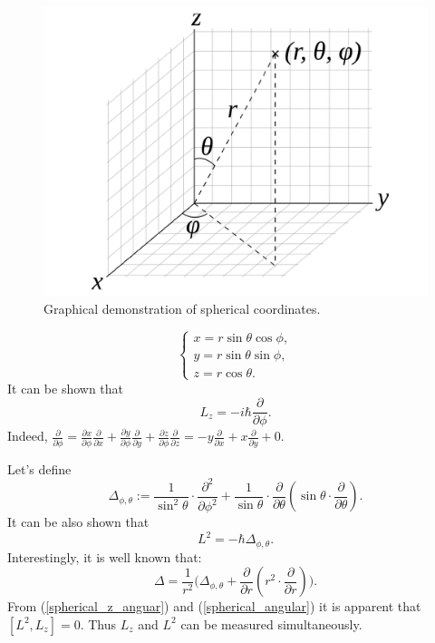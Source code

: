 \documentclass[main.tex]{subfiles}
\begin{document}
\begin{figure}[H]
\centering
\includegraphics[scale=0.5]{figs/Spherical}
\caption{Graphical demonstration of spherical coordinates.}
\label{fig:hoop}
\end{figure}
\begin{equation}
\begin{cases}
x = r\sin\theta \cos\phi,\\
y = r\sin\theta \sin\phi,\\
z = r\cos\theta.
\end{cases}
\end{equation}
It can be shown that
\begin{equation}
\label{spherical_z_anguar}
\boxed{
L_z = -i\hbar\frac{\partial}{\partial \phi}.
}
\end{equation}
Indeed, $\frac{\partial}{\partial \phi}
=\frac{\partial x}{\partial\phi}\frac{\partial}{\partial x}
+\frac{\partial y}{\partial\phi}\frac{\partial}{\partial y}
+\frac{\partial z}{\partial\phi}\frac{\partial}{\partial z}
= -y\frac{\partial}{\partial x} + x\frac{\partial}{\partial y} 
+ 0
$.

Let's define
\begin{equation}
\Delta_{\phi, \theta}:= \frac{1}{\sin ^2\theta}\cdot\frac{\partial ^2}{\partial \phi ^2}+\frac{1}{\sin \theta}\cdot\frac{\partial }{\partial \theta }\left(\sin \theta \cdot \frac{\partial}{\partial \theta }\right).
\end{equation}
It can be also shown that 
\begin{equation}
\label{spherical_angular}
\boxed{
L^2 = -\hbar \Delta_{\phi, \theta}.
}
\end{equation}
Interestingly, it is well known that:
\begin{equation}
\Delta = \frac{1}{r^2}\Bigg(\Delta _{\phi, \theta}+\frac{\partial }{\partial r}\left(r^2 \cdot\frac{\partial}{\partial r}\right)\Bigg).
\end{equation}
From (\ref{spherical_z_anguar}) and (\ref{spherical_angular}) it is apparent that $[L^2,L_z]=0$. Thus $L_z$ and $L^2$ can be measured simultaneously.
\end{document}
